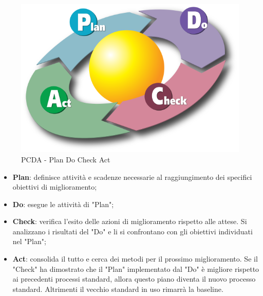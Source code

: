     \begin{figure}[h]
        \centering
        \includegraphics[scale=0.2]{sezioni/Immagini/PDCA.png}
        \caption{PCDA - Plan Do Check Act}
    \end{figure}

    \begin{itemize}
        \item \textbf{Plan}: definisce attività e scadenze necessarie al raggiungimento dei specifici obiettivi di miglioramento;
        \item \textbf{Do}: esegue le attività di "Plan";
        \item \textbf{Check}: verifica l'esito delle azioni di miglioramento rispetto alle attese. Si analizzano i risultati del "Do" e li si confrontano con gli obiettivi individuati nel "Plan";
        \item \textbf{Act}: consolida il tutto e cerca dei metodi per il prossimo miglioramento. Se il "Check" ha dimostrato che il "Plan" implementato dal "Do" è migliore rispetto ai precedenti processi standard, allora questo piano diventa il nuovo processo standard. Altrimenti il vecchio standard in uso rimarrà la baseline.
    \end{itemize}